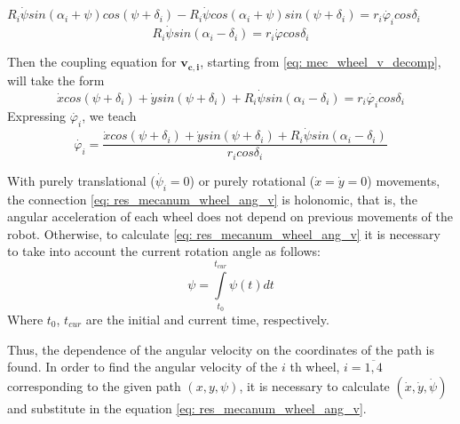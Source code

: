 \documentclass[oneside,final,14pt]{extreport}
\newcommand{\bs}{\boldsymbol}
\begin{document}
$
R_{i}
\dot{\psi}
sin (\alpha_{i} + \psi)
cos (\psi + \delta_{i})
-
R_{i}
\dot{\psi}
cos (\alpha_{i} + \psi)
sin (\psi + \delta_{i})
=
r_{i} \dot{\varphi_{i}}
cos \delta_{i}
$
\begin{equation}
R_{i}
\dot{\psi}
sin (\alpha_{i} - \delta_{i})
=
r_{i}
\dot{\varphi}
cos \delta_{i}
\end{equation}

Then the coupling equation for $ \bs{v_{c, i}} $, starting from \ref{eq: mec_wheel_v_decomp}, will take the form
\begin{equation}
\label{eq: res_mecanum_wheel_car}
\dot{x}
cos (\psi + \delta_{i})
+
\dot{y}
sin (\psi + \delta_{i})
+
R_{i}
\dot{\psi}
sin (\alpha_{i} - \delta_{i})
=
r_{i} \dot{\varphi_{i}}
cos \delta_{i}
\end{equation}
Expressing $ \dot{\varphi_{i}} $, we teach
\begin{equation}
\label{eq: res_mecanum_wheel_ang_v}
\dot{\varphi_{i}}
=
\frac{
\dot{x}
cos (\psi + \delta_{i})
+
\dot{y}
sin (\psi + \delta_{i})
+
R_{i}
\dot{\psi}
sin (\alpha_{i} - \delta_{i})
}
{
r_{i} cos \delta_{i}
}
\end{equation}

With purely translational ($ \dot{\psi_{i}} = 0 $) or purely rotational ($ \dot{x} = \dot{y} = 0 $) movements, the connection \ref{eq: res_mecanum_wheel_ang_v} is holonomic, that is, the angular acceleration of each wheel does not depend on previous movements of the robot. Otherwise, to calculate \ref{eq: res_mecanum_wheel_ang_v} it is necessary to take into account the current rotation angle as follows:
\begin{equation}
\psi
=
\int \limits_{t_{0}} ^{t_{cur}} \psi (t) dt
\end{equation}
Where $ t_{0} $, $ t_{cur} $ are the initial and current time, respectively.

Thus, the dependence of the angular velocity on the coordinates of the path is found. In order to find the angular velocity of the $ i $ th wheel, $ i = \overline{1,4} $ corresponding to the given path $ (x, y, \psi) $, it is necessary to calculate $ (\dot{x}, \dot{y}, \dot{\psi}) $ and substitute in the equation \ref{eq: res_mecanum_wheel_ang_v}.
\end{document}
